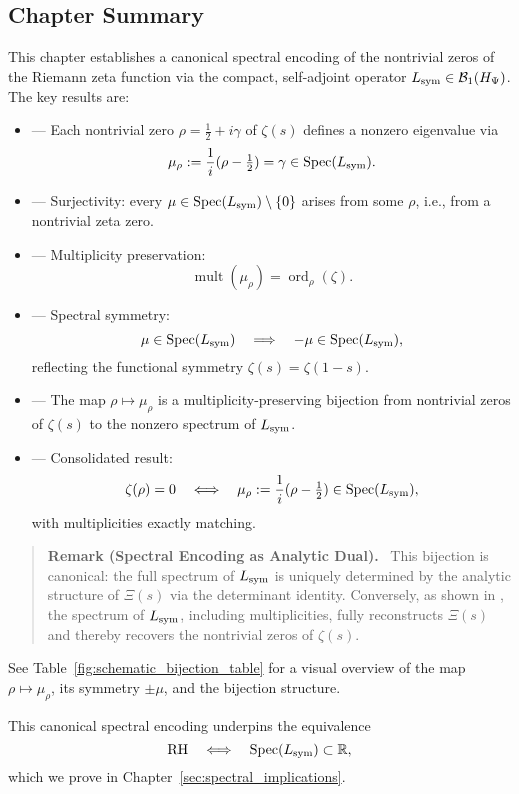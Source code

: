\subsection*{Chapter Summary}

This chapter establishes a canonical spectral encoding of the nontrivial zeros of the Riemann zeta function via the compact, self-adjoint operator \( L_{\mathrm{sym}} \in \mathcal{B}_1(H_{\Psi}) \). The key results are:

\begin{itemize}
  \item {} — Each nontrivial zero \( \rho = \tfrac{1}{2} + i\gamma \) of \( \zeta(s) \) defines a nonzero eigenvalue via
  \[
  \mu_\rho := \frac{1}{i}(\rho - \tfrac{1}{2}) = \gamma \in \operatorname{Spec}(L_{\mathrm{sym}}).
  \]

  \item {} — Surjectivity: every \( \mu \in \operatorname{Spec}(L_{\mathrm{sym}}) \setminus \{0\} \) arises from some \( \rho \), i.e., from a nontrivial zeta zero.

  \item {} — Multiplicity preservation:
  \[
  \operatorname{mult}(\mu_\rho) = \operatorname{ord}_\rho(\zeta).
  \]

  \item {} — Spectral symmetry:
  \[
  \mu \in \operatorname{Spec}(L_{\mathrm{sym}}) \quad \Longrightarrow \quad -\mu \in \operatorname{Spec}(L_{\mathrm{sym}}),
  \]
  reflecting the functional symmetry \( \zeta(s) = \zeta(1 - s) \).

  \item {} — The map \( \rho \mapsto \mu_\rho \) is a multiplicity-preserving bijection from nontrivial zeros of \( \zeta(s) \) to the nonzero spectrum of \( L_{\mathrm{sym}} \).

  \item {} — Consolidated result:
  \[
  \zeta(\rho) = 0 \quad \Longleftrightarrow \quad \mu_\rho := \frac{1}{i}(\rho - \tfrac{1}{2}) \in \operatorname{Spec}(L_{\mathrm{sym}}),
  \]
  with multiplicities exactly matching.
\end{itemize}

\begin{quote}
  \textbf{Remark (Spectral Encoding as Analytic Dual).}~
  This bijection is canonical: the full spectrum of \( L_{\mathrm{sym}} \) is uniquely determined by the analytic structure of \( \Xi(s) \) via the determinant identity. Conversely, as shown in , the spectrum of \( L_{\mathrm{sym}} \), including multiplicities, fully reconstructs \( \Xi(s) \) and thereby recovers the nontrivial zeros of \( \zeta(s) \).
\end{quote}

See Table~\ref{fig:schematic_bijection_table} for a visual overview of the map \( \rho \mapsto \mu_\rho \), its symmetry \( \pm\mu \), and the bijection structure.

\medskip

This canonical spectral encoding underpins the equivalence
\[
\mathrm{RH} \quad \Longleftrightarrow \quad \operatorname{Spec}(L_{\mathrm{sym}}) \subset \mathbb{R},
\]
which we prove in Chapter~\ref{sec:spectral_implications}.
